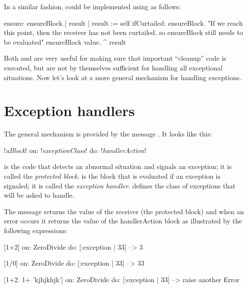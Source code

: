\documentclass[a4paper,10pt,twoside]{book}
\begin{document}
In a similar fashion,  could be implemented using  as follows:

\begin{code}{}
ensure: ensureBlock
	| result |
	result := self ifCurtailed: ensureBlock.
	"If we reach this point, then the receiver has not been curtailed,
	so ensureBlock still needs to be evaluated"
	ensureBlock value.
	^ result
\end{code}

Both  and  are very useful for making sure that important ``cleanup'' code is executed, but are not by themselves sufficient for handling all exceptional situations.
Now let's look at a more general mechanism for handling exceptions.

\section{Exception handlers}

The general mechanism is provided by the message . It looks like this:
\begin{code}{}
!\emph{aBlock}! on: !\emph{exceptionClass}! do: !\emph{handlerAction}!
\end{code}
\noindent
{} is the code that detects an abnormal situation and signals an exception; it is called the \emph{protected block}.   
 is the block that is evaluated if an exception is signaled; it is called the \emph{exception handler}.
 defines the class of exceptions that  will be asked to handle.


The message  returns the value of the receiver (the protected block) and when an error occurs it returns the value of the handlerAction block as illustrated by the following expressions:

\begin{code}{}
[1+2] on: ZeroDivide do: [:exception | 33] 
--> 3

[1/0] on: ZeroDivide do: [:exception | 33] 
--> 33

[1+2. 1+ 'kjhjkhjk'] on: ZeroDivide do: [:exception | 33] 
--> raise another Error 
\end{code}



\end{document}
